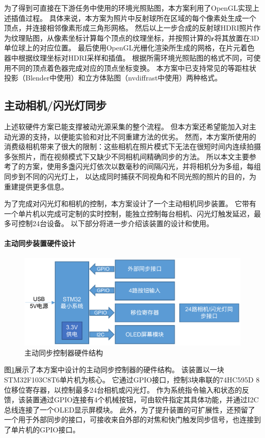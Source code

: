 为了得到可直接在下游任务中使用的环境光照贴图，本方案利用了OpenGL实现上述插值过程。
具体来说，本方案为照片中反射球所在区域的每个像素处生成一个顶点，并连接相邻像素形成三角形网格。
然后以上一步合成的反射球HDRI照片作为纹理贴图，从像素坐标计算每个顶点的纹理坐标，并按照计算的$\mathbf{r}$将其放置在3D单位球上的对应位置。
最后使用OpenGL光栅化渲染所生成的网格，在片元着色器中根据纹理坐标对HDRI采样和插值。
根据所需环境光照贴图的格式不同，可使用不同的顶点着色器完成对应的顶点坐标变换。
本方案中已支持常见的等距柱状投影（Blender中使用）和立方体贴图（nvdiffrast中使用）两种格式。

\subsection{主动相机/闪光灯同步}

上述软硬件方案已能支撑被动光源采集的整个流程。
但本方案还希望能加入对主动光源的支持，以便能实验和对比不同重建方法的优劣。
然而，本方案所使用的消费级相机带来了很大的限制：这些相机在照片模式下无法在很短时间内连续拍摄多张照片，而在视频模式下又缺少不同相机间精确同步的方法。
所以本文主要参考了\citet{FyffeGTGD16}的方案，使用多盏闪光灯依次以数毫秒的间隔闪光，并将相机分为多组，每组同步到不同的闪光灯上，
以达成同时捕获不同视角和不同光照的照片的目的，为重建提供更多信息。

为了完成对闪光灯和相机的控制，本方案设计了一个主动相机同步装置。
它带有一个单片机以完成可定制的实时控制，能独立控制每台相机、闪光灯触发延迟，最多可控制24台设备。
以下部分将进一步介绍该装置的设计和使用。

\paragraph{主动同步装置硬件设计}

\begin{figure}
\centering
\includegraphics[width=0.8\linewidth]{figures/active_sync.png}
\caption{主动同步控制器硬件结构}
\label{fig:active_sync}
\end{figure}
图\ref{fig:active_sync}展示了本方案中设计的主动同步控制器的硬件结构。
该装置以一块STM32F103C8T6单片机为核心。
它通过GPIO接口，控制3块串联的74HC595D 8位移位寄存器，以控制最多24台相机或闪光灯。
作为系统指令输入和状态的反馈，该装置通过GPIO连接有4个机械按钮，可由软件指定其具体功能，并通过I2C总线连接了一个OLED显示屏模块。
此外，为了提升装置的可扩展性，还预留了一个用于外部同步的接口，可接收来自外部的对焦和快门触发同步信号，也连接到了单片机的GPIO接口。

